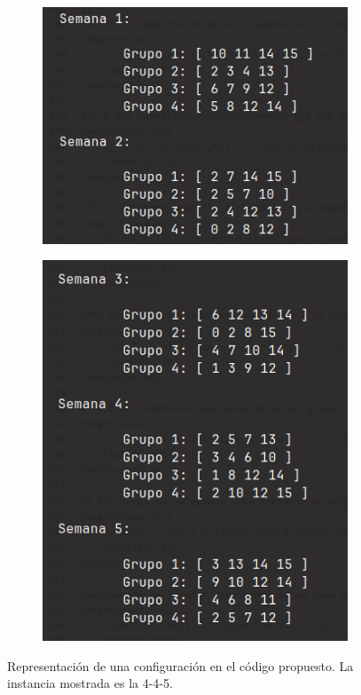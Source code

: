\documentclass[letter, 10pt]{article}
\begin{document}
\begin{figure}[h]
    \centering
    \begin{subfigure}[b]{0.3\textwidth}
        \centering
    \includegraphics[width=\textwidth]{figures/conf_1.png}

    \end{subfigure}
    \hspace{1mm}
    \begin{subfigure}[b]{0.3\textwidth}
        \centering
        \includegraphics[width=\textwidth]{figures/conf_2.png}
    \end{subfigure}
        \caption{Representación de una configuración en el código propuesto. La instancia mostrada es la 4-4-5.}
    \label{fig:config_cod}
\end{figure}
\end{document}
